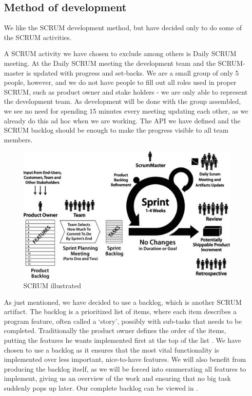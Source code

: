 \subsection{Method of development}
We like the SCRUM development method, but have decided only to do some of the SCRUM activities.

A SCRUM activity we have chosen to exclude among others is Daily SCRUM meeting.
At the Daily SCRUM meeting the development team and the SCRUM-master is updated with progress and set-backs.
We are a small group of only 5 people, however, and we do not have people to fill out all roles used in proper SCRUM, such as product owner and stake holders - we are only able to represent the development team.
As development will be done with the group assembled, we see no need for spending 15 minutes every meeting updating each other, as we already do this ad hoc when we are working.
The API we have defined and the SCRUM backlog should be enough to make the progress visible to all team members.

\begin{figure}[H]
  \includegraphics[width=\textwidth]{illustrations/scrum.jpg}
  \caption{SCRUM illustrated}
  \label{scrum_picture}
\end{figure}

As just mentioned, we have decided to use a backlog, which is another SCRUM artifact.
The backlog is a prioritized list of items, where each item describes a program feature, often called a `story', possibly with sub-tasks that needs to be completed. Traditionally the product owner defines the order of the items, putting the features he wants implemented first at the top of the list \cite[p. 12]{scrum-org-guide}.
We have chosen to use a backlog as it ensures that the most vital functionality is implemented over less important, nice-to-have features. We will also benefit from producing the backlog itself, as we will be forced into enumerating all features to implement, giving us an overview of the work and ensuring that no big task suddenly pops up later.
Our complete backlog can be viewed in .

